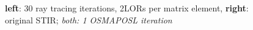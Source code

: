 \documentclass{beamer}
\begin{document}
\begin{frame}
  \begin{figure}
    \centering
    \caption{\textbf{left}: 30 ray tracing iterations, 2LORs per matrix element, \textbf{right}: original STIR; \textsl{both: 1 OSMAPOSL iteration}}
  \end{figure}
\end{frame}
\end{document}
